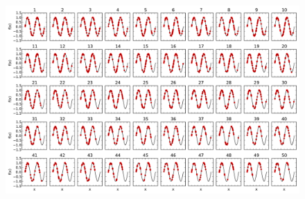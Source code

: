 \documentclass{article}
\begin{document}
\begin{figure}
\centering
\includegraphics[width=1.0\textwidth]{gaSearchingMe.pdf}
\end{figure}

\clearpage
\end{document}
